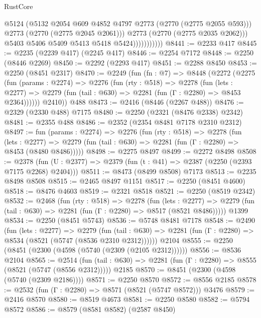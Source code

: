 \begin{lexlean}{RustCore}
\begin{coremodule}
                              @5124
                              (@5132 @2054 @609 @4852 @4797 @2773 (@2770 (@2775 @2055 @593)))
                              @2773
                              (@2770 (@2775 @2045 @2061)))
                            @2773
                            (@2770 (@2775 @2035 @2062)))
                          @5403
                          @5406
                          @5409
                          @5413
                          @5418
                          @5424)))))))))))
@8441 := @2233 @417
@8445 := @2235 (@2239 @417) (@2245 @417)
@8446 := @2254 @7172
@8448 := @2250 (@8446 @2269)
@8450 := @2292 (@2293 @417)
@8451 := @2288 @8450
@8453 := @2250 (@8451 @2317)
@8470 := @2249
    (fun (fn : @7) =>
    @8448
      (@2272
        (@2275
          (fun (params : @2274) =>
          @2276
            (fun (rty : @518) =>
            @2278
              (fun (lets : @2277) =>
              @2279 (fun (tail : @630) => @2281 (fun (Γ : @2280) => @8453 @2364))))))
        @2410))
    @488
@8473 := @2416 (@8446 (@2267 @488))
@8476 := @2329 (@2330 @488) @7175
@8480 := @2250 (@2321 (@8476 @2338) @2342)
@8481 := @2355 @488
@8486 := @2352 (@2354 @8481 @7178 @2310 @2312)
@8497 := fun (params : @2274) =>
  @2276
    (fun (rty : @518) =>
    @2278
      (fun (lets : @2277) =>
      @2279 (fun (tail : @630) => @2281 (fun (Γ : @2280) => @8453 (@8480 @8486)))))
@8498 := @2275 @8497
@8499 := @2272 @8498
@8508 := @2378 (fun (U : @2377) => @2379 (fun (t : @41) => @2387 (@2250 (@2393 @7175 @2268) @2404)))
@8511 := @8473 (@8499 @8508) @7173
@8513 := @2235 @8498 @8508
@8515 := @2465 @8497 @1151
@8517 := @2250 (@8451 @4600)
@8518 := @8476 @4603
@8519 := @2321 @8518
@8521 := @2250 (@8519 @2342)
@8532 := @2468
    (fun (rty : @518) =>
    @2278
      (fun (lets : @2277) =>
      @2279 (fun (tail : @630) => @2281 (fun (Γ : @2280) => @8517 (@8521 @8486)))))
    @1399
@8534 := @2250 (@8451 @5743)
@8536 := @5748 @8481 @7178
@8548 := @2490
    (fun (lets : @2277) =>
    @2279
      (fun (tail : @630) => @2281 (fun (Γ : @2280) => @8534 (@8521 (@5747 (@8536 @2310 @2312))))))
    @2104
@8555 := @2250 (@8451 (@2300 (@4598 (@5740 (@2309 (@2105 @2312))))))
@8556 := @8536 @2104
@8565 := @2514
    (fun (tail : @630) => @2281 (fun (Γ : @2280) => @8555 (@8521 (@5747 (@8556 @2312)))))
    @2185
@8570 := @8451 (@2300 (@4598 (@5740 (@2309 @2186))))
@8571 := @2250 @8570
@8572 := @8556 @2185
@8578 := @2532 (fun (Γ : @2280) => @8571 (@8521 (@5747 @8572))) @3476
@8579 := @2416 @8570
@8580 := @8519 @4673
@8581 := @2250 @8580
@8582 := @5794 @8572
@8586 := @8579 (@8581 @8582) (@2587 @8450)

\end{coremodule}
\end{lexlean}
